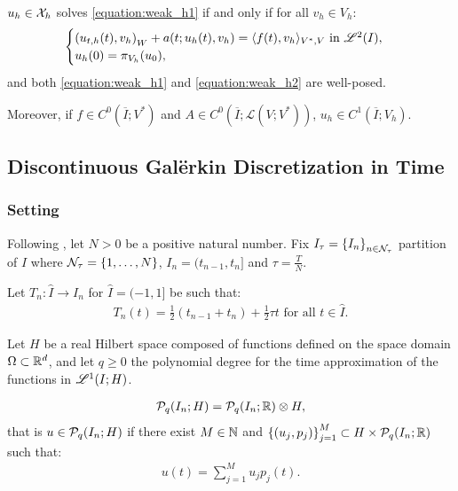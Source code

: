 \begin{proposition}[Equivalence]
    $u_h \in \mathcal{X}_h$ solves \eqref{equation:weak_h1} if and only if for all $v_h \in V_h$:
    \begin{gather}
        \begin{cases} \label{equation:weak_h2}
            \left( u_{t, h}(t), v_h \right)_W + a(t; u_h(t), v_h) = \langle f(t), v_h \rangle_{V^*, V} \text{ in } \mathscr{L}^{2}(I), \\
            u_h(0) = \pi_{V_h}(u_0),
        \end{cases}
    \end{gather}
    and both \eqref{equation:weak_h1} and \eqref{equation:weak_h2} are well-posed.

    Moreover, if $f \in C^0(\overline{I}; V^*)$ and $A \in C^0(\overline{I}; \mathcal{L}(V; V^*))$, $u_h \in C^1(\overline{I}; V_h)$.
\end{proposition}

\newpage
\subsection{Discontinuous Galërkin Discretization in Time}

\subsubsection{Setting}

Following \cite[p. 177]{Ern2021}, let $N > 0$ be a positive natural number. Fix $I_{\tau} = \left\{ I_n \right\}_{n \in \mathcal{N}_{\tau}}$ partition of $I$ where $\mathcal{N}_{\tau} = \left\{ 1, \dots, N \right\}$, $I_n = (t_{n - 1}, t_n]$ and $\tau = \frac{T}{N}$.

\begin{definition}[Mapping]
    Let $T_n \colon \hat{I} \rightarrow I_n$ for $\hat{I} = (-1, 1]$ be such that:
    \begin{gather}
        T_n(t) = \frac{1}{2}(t_{n - 1} + t_n) + \frac{1}{2} \tau t \text{ for all } t \in \hat{I}.
    \end{gather}
\end{definition}

Let $H$ be a real Hilbert space composed of functions defined on the space domain $\Omega \subset \mathbb{R}^{d}$, and let $q \geq 0$ the polynomial degree for the time approximation of the functions in $\mathscr{L}^{1}(I; H)$.

\begin{definition}[$\Pk{q}(I_n; H)$]
    \begin{gather}
        \mathcal{P}_{q}(I_n; H) = \mathcal{P}_{q}(I_n; \mathbb{R}) \otimes H,
    \end{gather}
    that is $u \in \mathcal{P}_{q}(I_n; H)$ if there exist $M \in \mathbb{N}$ and $\left\{ (u_j, p_j) \right\}_{j = 1}^M \subset H \times \mathcal{P}_{q}(I_n; \mathbb{R})$ such that:
    \begin{gather}
        u(t) = \sum_{j = 1}^M u_j p_j(t).
    \end{gather}
\end{definition}


